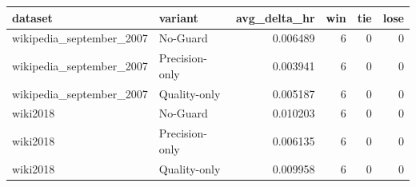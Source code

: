 \begin{tabular}{llrrrr}
\toprule
                 dataset &        variant &  avg\_delta\_hr &  win &  tie &  lose \\
\midrule
wikipedia\_september\_2007 &       No-Guard &      0.006489 &    6 &    0 &     0 \\
wikipedia\_september\_2007 & Precision-only &      0.003941 &    6 &    0 &     0 \\
wikipedia\_september\_2007 &   Quality-only &      0.005187 &    6 &    0 &     0 \\
                wiki2018 &       No-Guard &      0.010203 &    6 &    0 &     0 \\
                wiki2018 & Precision-only &      0.006135 &    6 &    0 &     0 \\
                wiki2018 &   Quality-only &      0.009958 &    6 &    0 &     0 \\
\bottomrule
\end{tabular}
